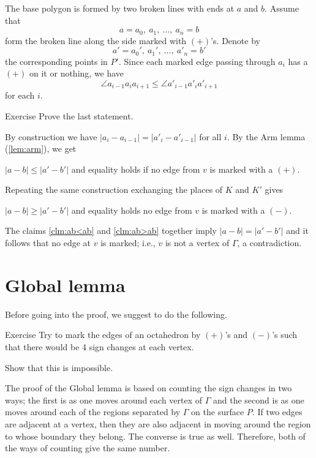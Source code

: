 The base polygon is formed by two broken lines with ends at $a$ and $b$.
Assume that 
$$a=a_0,\ a_1,\ \dots,\ a_n=b$$ 
form the broken line along the side marked with $(+)$'s.
Denote by 
$$a'=a_0',\  a_1',\ \dots,\ a'_n=b'$$ 
the corresponding points in $P'$.
Since each marked edge passing through $a_i$ has a $(+)$ on it or nothing, 
we have $$\angle a_{i-1}a_ia_{i+1}\le\angle  a'_{i-1}a'_ia'_{i+1}$$
for each $i$.
\begin{thm}{Exercise}
Prove the last statement. 
\end{thm}
By construction we have $|a_i-a_{i-1}|=|a'_i-a'_{i-1}|$ for all $i$.
By the Arm lemma (\ref{lem:arm}), 
we get 
\begin{clm}{}\label{clm:ab<ab}
$|a-b|\le |a'-b'|$ and equality holds if no edge from $v$ is marked with a $(+)$.
\end{clm}
Repeating the same construction exchanging the places of $K$ and $K'$ gives  
\begin{clm}{}\label{clm:ab>ab}
$|a-b|\ge |a'-b'|$ and equality holds no edge from $v$ is marked with a $(-)$.
\end{clm}

The claims 
\ref{clm:ab<ab}  and \ref{clm:ab>ab} 
together imply $|a-b|=|a'-b'|$ 
and it follows that no edge at $v$ is marked;
i.e., $v$ is not a vertex of $\Gamma$,
a contradiction.
\qeds

\section{Global lemma}

Before going into the proof, we suggest to do the following.

\begin{thm}{Exercise}
Try to mark the edges of an octahedron
by $(+)$'s and $(-)$'s
such that there would be 4 sign changes at each vertex.

Show that this is impossible.
\end{thm}

The proof of the Global lemma is based on counting the sign changes 
in two ways;
the first is as one moves around each vertex of $\Gamma$ 
and the second is as one moves around each of the regions separated by $\Gamma$
on the surface $P$. 
If two edges are adjacent at a vertex,
then they are also adjacent in moving around the region to whose boundary
they belong. 
The converse is true as well. 
Therefore, both of the ways of counting give the same number.




